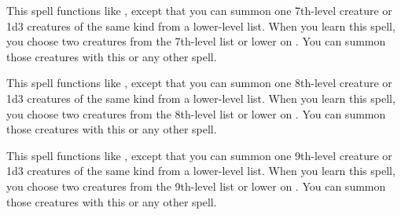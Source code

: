 \spelleffect This spell functions like , except that you can summon one 7th-level creature or 1d3 creatures of the same kind from a lower-level list. When you learn this spell, you choose two creatures from the 7th-level list or lower on . You can summon those creatures with this or any other  spell.

\spelleffect This spell functions like , except that you can summon one 8th-level creature or 1d3 creatures of the same kind from a lower-level list. When you learn this spell, you choose two creatures from the 8th-level list or lower on . You can summon those creatures with this or any other  spell.

\spelleffect This spell functions like , except that you can summon one 9th-level creature or 1d3 creatures of the same kind from a lower-level list. When you learn this spell, you choose two creatures from the 9th-level list or lower on . You can summon those creatures with this or any other  spell.

